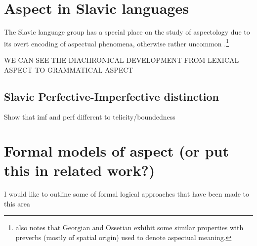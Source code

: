 \section{Aspect in Slavic languages}
The Slavic language group has a special place on the study of aspectology due to its overt encoding of aspectual phenomena, otherwise rather uncommon \citep{slavstyleaspect}.\footnote{\citet{slavstyleaspect} also notes that Georgian and Ossetian exhibit some similar properties with preverbs (mostly of spatial origin) used to denote aspectual meaning.}

WE CAN SEE THE DIACHRONICAL DEVELOPMENT FROM LEXICAL ASPECT TO GRAMMATICAL ASPECT

\subsection{Slavic Perfective-Imperfective distinction}
Show that imf and perf different to telicity/boundedness

\section{Formal models of aspect (or put this in related work?)}
I would like to outline some of formal logical approaches that have been made to this area